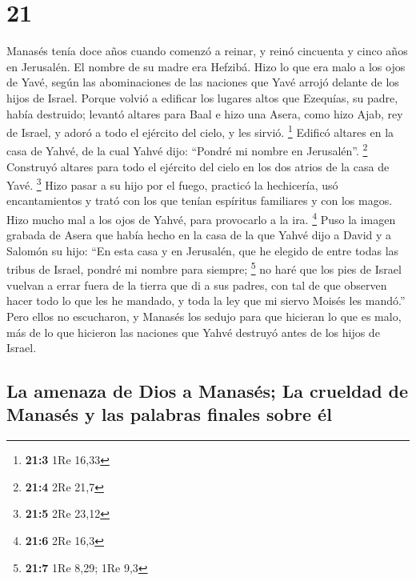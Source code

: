 \hypertarget{section-20}{%
\section{21}\label{section-20}}

 Manasés tenía doce años cuando comenzó a reinar, y reinó
cincuenta y cinco años en Jerusalén. El nombre de su madre era Hefzibá.
 Hizo lo que era malo a los ojos de Yavé, según las
abominaciones de las naciones que Yavé arrojó delante de los hijos de
Israel.  Porque volvió a edificar los lugares altos que
Ezequías, su padre, había destruido; levantó altares para Baal e hizo
una Asera, como hizo Ajab, rey de Israel, y adoró a todo el ejército del
cielo, y les sirvió. \footnote{\textbf{21:3} 1Re 16,33} 
Edificó altares en la casa de Yahvé, de la cual Yahvé dijo: ``Pondré mi
nombre en Jerusalén''. \footnote{\textbf{21:4} 2Re 21,7} 
Construyó altares para todo el ejército del cielo en los dos atrios de
la casa de Yavé. \footnote{\textbf{21:5} 2Re 23,12}  Hizo
pasar a su hijo por el fuego, practicó la hechicería, usó encantamientos
y trató con los que tenían espíritus familiares y con los magos. Hizo
mucho mal a los ojos de Yahvé, para provocarlo a la ira. \footnote{\textbf{21:6}
  2Re 16,3}  Puso la imagen grabada de Asera que había
hecho en la casa de la que Yahvé dijo a David y a Salomón su hijo: ``En
esta casa y en Jerusalén, que he elegido de entre todas las tribus de
Israel, pondré mi nombre para siempre; \footnote{\textbf{21:7} 1Re 8,29;
  1Re 9,3}  no haré que los pies de Israel vuelvan a errar
fuera de la tierra que di a sus padres, con tal de que observen hacer
todo lo que les he mandado, y toda la ley que mi siervo Moisés les
mandó.''  Pero ellos no escucharon, y Manasés los sedujo
para que hicieran lo que es malo, más de lo que hicieron las naciones
que Yahvé destruyó antes de los hijos de Israel.

\hypertarget{la-amenaza-de-dios-a-manasuxe9s-la-crueldad-de-manasuxe9s-y-las-palabras-finales-sobre-uxe9l}{%
\subsection{La amenaza de Dios a Manasés; La crueldad de Manasés y las
palabras finales sobre
él}\label{la-amenaza-de-dios-a-manasuxe9s-la-crueldad-de-manasuxe9s-y-las-palabras-finales-sobre-uxe9l}}

